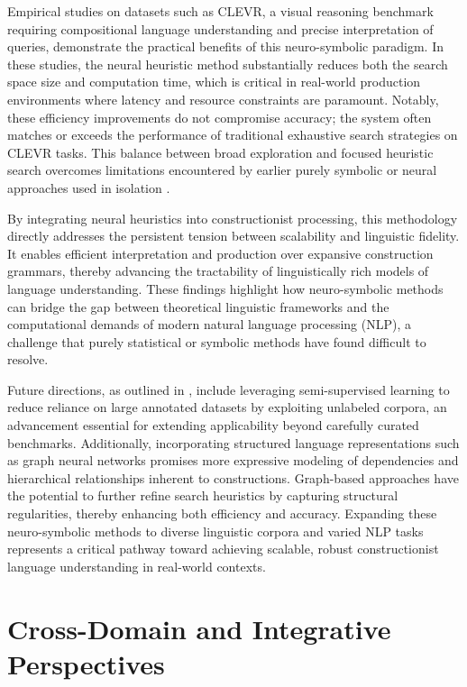 \documentclass[sigconf]{acmart}
\begin{document}
Empirical studies on datasets such as CLEVR, a visual reasoning benchmark requiring compositional language understanding and precise interpretation of queries, demonstrate the practical benefits of this neuro-symbolic paradigm. In these studies, the neural heuristic method substantially reduces both the search space size and computation time, which is critical in real-world production environments where latency and resource constraints are paramount. Notably, these efficiency improvements do not compromise accuracy; the system often matches or exceeds the performance of traditional exhaustive search strategies on CLEVR tasks. This balance between broad exploration and focused heuristic search overcomes limitations encountered by earlier purely symbolic or neural approaches used in isolation \cite{ref40}.

By integrating neural heuristics into constructionist processing, this methodology directly addresses the persistent tension between scalability and linguistic fidelity. It enables efficient interpretation and production over expansive construction grammars, thereby advancing the tractability of linguistically rich models of language understanding. These findings highlight how neuro-symbolic methods can bridge the gap between theoretical linguistic frameworks and the computational demands of modern natural language processing (NLP), a challenge that purely statistical or symbolic methods have found difficult to resolve.

Future directions, as outlined in \cite{ref40}, include leveraging semi-supervised learning to reduce reliance on large annotated datasets by exploiting unlabeled corpora, an advancement essential for extending applicability beyond carefully curated benchmarks. Additionally, incorporating structured language representations such as graph neural networks promises more expressive modeling of dependencies and hierarchical relationships inherent to constructions. Graph-based approaches have the potential to further refine search heuristics by capturing structural regularities, thereby enhancing both efficiency and accuracy. Expanding these neuro-symbolic methods to diverse linguistic corpora and varied NLP tasks represents a critical pathway toward achieving scalable, robust constructionist language understanding in real-world contexts.

\section{Cross-Domain and Integrative Perspectives}
\end{document}
